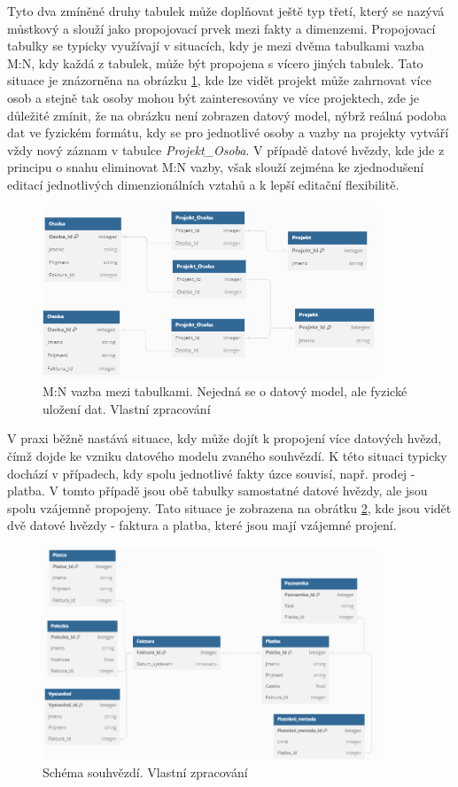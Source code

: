 \documentclass[
  digital,     %
  twoside,     %
  lof,         %
  lot,         %
]{fithesis4}
\begin{document}
Tyto dva zmíněné druhy tabulek může doplňovat ještě typ třetí, který se nazývá můstkový a slouží jako propojovací prvek mezi fakty a dimenzemi. Propojovací tabulky se typicky využívají v situacích, kdy je mezi dvěma tabulkami vazba M:N, kdy každá z tabulek, může být propojena s vícero jiných tabulek. Tato situace je znázorněna na  
obrázku \ref{fig:M_N}, kde lze vidět projekt může zahrnovat více osob a stejně tak osoby mohou být zainteresovány ve více projektech, zde je důležité zmínit, že na obrázku není zobrazen datový model, nýbrž reálná podoba dat ve fyzickém formátu, kdy se pro jednotlivé osoby a vazby na projekty vytváří vždy nový záznam v tabulce \emph{Projekt\_Osoba}. V případě datové hvězdy, kde jde z principu o snahu eliminovat M:N vazby, však slouží zejména ke zjednodušení editací jednotlivých dimenzionálních vztahů a k lepší editační flexibilitě. 
\begin{figure}[h]
  \begin{center}
          \includegraphics[width=10cm]{img/M_N.png}
  \end{center}
  \caption{M:N vazba mezi tabulkami. Nejedná se o datový model, ale fyzické uložení dat.  Vlastní zpracování}
  \label{fig:M_N}
\end{figure}  

V praxi běžně nastává situace, kdy může dojít k propojení více datových hvězd, čímž dojde ke vzniku datového modelu zvaného souhvězdí. K této situaci typicky dochází v případech, kdy spolu jednotlivé fakty úzce souvisí, např. prodej - platba. V tomto případě jsou obě tabulky samostatné datové hvězdy, ale jsou spolu vzájemně propojeny. Tato situace je zobrazena na obrátku \ref{fig:constellation}, kde jsou vidět dvě datové hvězdy - faktura a platba, které jsou mají vzájemné projení.

\begin{figure}[h]
  \begin{center}
          \includegraphics[width=10cm]{img/Constellations.png}
  \end{center}
  \caption{Schéma souhvězdí.  Vlastní zpracování}
  \label{fig:constellation}
\end{figure}  
\end{document}
